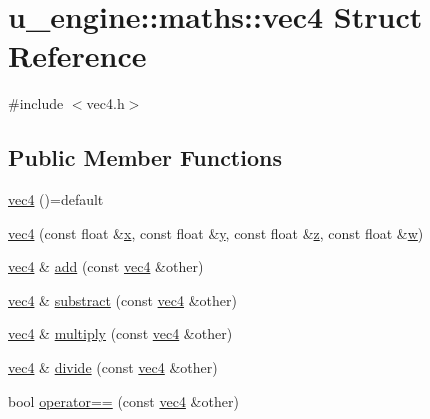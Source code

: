 \hypertarget{structu__engine_1_1maths_1_1vec4}{}\section{u\+\_\+engine\+:\+:maths\+:\+:vec4 Struct Reference}
\label{structu__engine_1_1maths_1_1vec4}


{\ttfamily \#include $<$vec4.\+h$>$}

\subsection*{Public Member Functions}
\begin{DoxyCompactItemize}
\item 
\hyperlink{structu__engine_1_1maths_1_1vec4_a27572645f3e2c3e21447dba4fb43fe9e}{vec4} ()=default
\item 
\hyperlink{structu__engine_1_1maths_1_1vec4_ad631a181d415966bb60ff6957d3e86f2}{vec4} (const float \&\hyperlink{glew_8h_ad77deca22f617d3f0e0eb786445689fc}{x}, const float \&\hyperlink{glew_8h_a9298c7ad619074f5285b32c6b72bfdea}{y}, const float \&\hyperlink{glew_8h_a826e1ac898f4ef56cea62219f74607db}{z}, const float \&\hyperlink{glew_8h_a433584688554d9a05d22844c39473968}{w})
\item 
\hyperlink{structu__engine_1_1maths_1_1vec4}{vec4} \& \hyperlink{structu__engine_1_1maths_1_1vec4_aa4235b88548c3fa37481b7486cfc80c5}{add} (const \hyperlink{structu__engine_1_1maths_1_1vec4}{vec4} \&other)
\item 
\hyperlink{structu__engine_1_1maths_1_1vec4}{vec4} \& \hyperlink{structu__engine_1_1maths_1_1vec4_ace7cc83f8c8ba43864caf8a5a508e175}{substract} (const \hyperlink{structu__engine_1_1maths_1_1vec4}{vec4} \&other)
\item 
\hyperlink{structu__engine_1_1maths_1_1vec4}{vec4} \& \hyperlink{structu__engine_1_1maths_1_1vec4_af65b36c890031315de94d474fa56f6fc}{multiply} (const \hyperlink{structu__engine_1_1maths_1_1vec4}{vec4} \&other)
\item 
\hyperlink{structu__engine_1_1maths_1_1vec4}{vec4} \& \hyperlink{structu__engine_1_1maths_1_1vec4_a52fd7b26797d488d2059acc885d56092}{divide} (const \hyperlink{structu__engine_1_1maths_1_1vec4}{vec4} \&other)
\item 
bool \hyperlink{structu__engine_1_1maths_1_1vec4_adef6410dbb61af15d95f8784a57b460c}{operator==} (const \hyperlink{structu__engine_1_1maths_1_1vec4}{vec4} \&other)
\item 

\end{DoxyCompactItemize}
